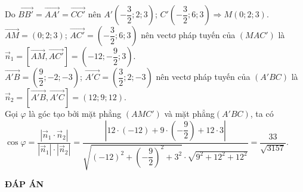 \begin{ex}
{{
}
\noindent Do $\overrightarrow{BB'}=\overrightarrow{AA'}=\overrightarrow{CC'}$ nên $A'\left(-\dfrac{3}{2};2;3\right)$; $C'\left(-\dfrac{3}{2};6;3\right)\Rightarrow M\left(0;2;3\right)$.\\
$\overrightarrow{AM}=\left(0;2;3\right)$; $\overrightarrow{AC'}=\left(-\dfrac{3}{2};6;3\right)$ nên vectơ pháp tuyến của $\left(MAC'\right)$ là $\overrightarrow{n}_1=\left[\overrightarrow{AM},\overrightarrow{AC'}\right]=\left(-12;-\dfrac{9}{2};3\right)$.\\
$\overrightarrow{A'B}=\left(\dfrac{9}{2};-2;-3\right)$; $\overrightarrow{A'C}=\left(\dfrac{3}{2};2;-3\right)$ nên vectơ pháp tuyến của $\left(A'BC\right)$ là $\overrightarrow{n}_2=\left[\overrightarrow{A'B},\overrightarrow{A'C}\right]=\left(12;9;12\right)$.\\
Gọi $\varphi $ là góc tạo bởi mặt phẳng $\left(AMC'\right)$ và mặt phẳng$\left(A'BC\right)$, ta có\\
$\cos \varphi =\dfrac{\left| \overrightarrow{n}_1\cdot\overrightarrow{n}_2\right|}{\left| \overrightarrow{n}_1\right|\cdot\left| \overrightarrow{n}_2\right|}=\dfrac{\left| 12\cdot(-12)+9\cdot\left(-\dfrac{9}{2}\right)+12\cdot 3\right|}{\sqrt{\left(-12\right)^2+\left(-\dfrac{9}{2}\right)^2+3^2}\cdot\sqrt{9^2+12^2+12^2}}=\dfrac{33}{\sqrt{3157}}$.
}
\end{ex}

\newpage
\begin{center}
	\textbf{ĐÁP ÁN}
\end{center}
\begin{multicols}{10}
	 
\end{multicols}